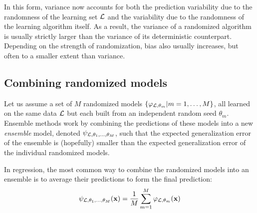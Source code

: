 In this form, variance now accounts for both the prediction variability due to
the randomness of the learning set ${\cal L}$ and the variability due to the
randomness of the learning algorithm itself. As a result, the variance of a
randomized algorithm is usually strictly larger than the variance of its
deterministic counterpart. Depending on the strength of randomization, bias
also usually increases, but often to a smaller extent than variance.


\subsection{Combining randomized models}

Let us assume a set of $M$ randomized models $\{\varphi_{{\cal L}, \theta_m} |
m = 1, \dots, M \}$, all learned on the same data ${\cal L}$ but each built
from an independent random seed $\theta_m$. Ensemble methods work by combining
the predictions of these models into a new \textit{ensemble} model, denoted
$\psi_{{\cal L},\theta_1,\dots,\theta_M}$, such that the expected
generalization error of the ensemble is (hopefully) smaller than the expected
generalization error of the individual randomized models.

In regression, the most common way to combine the randomized models into an
ensemble is to average their predictions to form the final prediction:
\begin{equation}
\psi_{{\cal L},\theta_1,\dots,\theta_M}(\mathbf{x}) = \frac{1}{M} \sum_{m=1}^M \varphi_{{\cal L},\theta_m}(\mathbf{x})
\end{equation}

